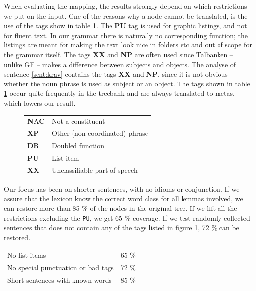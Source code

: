 \documentclass{report}
\begin{document}
When evaluating the mapping, the results strongly depend on which restrictions we
put on the input. 
One of the reasons why a node cannot be translated, is the 
use of the tags show in table \ref{fig:mapBadtag}.
The \textbf{PU} tag is used for graphic listings, and not for fluent text.
In our grammar there is naturally no corresponding function; 
the listings are meant for making the text look nice in
folders etc and out of scope for the grammar itself. The tags \textbf{XX} and \textbf{NP} are often used since
Talbanken -- unlike GF -- makes a difference between subjects
and objects. %
The analyse of sentence \ref{sent:krav}
\label{sent:krav}
contains the tags \textbf{XX} and \textbf{NP}, since it is not obvious
whether the noun phrase is used as subject or an object.
The tags shown in table \ref{fig:mapBadtag} occur quite frequently in the treebank and are always translated
to metas, which lowers our result. \\
\begin{figure}[h]
\begin{tabular}{ll}
\textbf{NAC} & Not a constituent\\
\textbf{XP} & Other (non-coordinated) phrase\\
\textbf{DB} & Doubled function\\
\textbf{PU} & List item\\
\textbf{XX} & Unclassifiable part-of-speech\\
\end{tabular}
\caption{}\label{fig:mapBadtag}
\end{figure}


Our focus has been on shorter sentences, with no idioms or conjunction.
If we assure that the lexicon know the correct word class for all lemmas
involved, we
can restore more than 85 \% of the nodes in the original tree.
If we lift all the restrictions excluding the \verb|PU|, we get
65 \% coverage. 
If we test randomly collected sentences that does not contain any of the tags listed
in figure \ref{fig:mapBadtag}, 72 \% can be restored. \\

\begin{tabular}{|ll|}
\hline
No list items & 65 \%\\
No special punctuation or bad tags& 72 \%\\
Short sentences with known words & 85 \%\\
\hline
\end{tabular}\\
\end{document}
